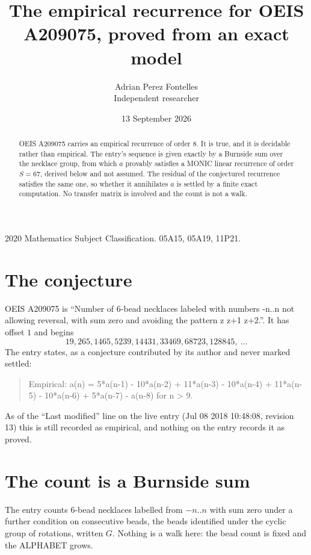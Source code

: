 \documentclass[11pt,a4paper]{article}
\title{The empirical recurrence for OEIS A209075, proved from an exact model}
\author{Adrian Perez Fontelles\\ \small Independent researcher}
\date{13 September 2026}
\theoremstyle{plain}
\theoremstyle{definition}
\begin{document}
\maketitle

\begin{abstract}
OEIS A209075 carries an empirical recurrence of order $8$. It is true, and it is
decidable rather than empirical. The entry's sequence is given exactly by a Burnside sum over the necklace group, from
which $a$ provably satisfies a MONIC linear recurrence of order $S=67$, derived below and not
assumed. The residual of the conjectured recurrence satisfies the same one, so whether it
annihilates $a$ is settled by a finite exact computation. No transfer matrix is involved and
the count is not a walk.
\end{abstract}

\noindent\small 2020 Mathematics Subject Classification. 05A15, 05A19, 11P21.\normalsize

\section{The conjecture}

OEIS A209075 is ``Number of 6-bead necklaces labeled with numbers -n..n not allowing reversal, with sum zero and avoiding the pattern z z+1 z+2.''. It has offset $1$ and begins
\[
19, 265, 1465, 5239, 14431, 33469, 68723, 128845,\ \dots
\]
The entry states, as a conjecture contributed by its author and never marked settled:
\begin{quote}
Empirical: a(n) = 5*a(n-1) - 10*a(n-2) + 11*a(n-3) - 10*a(n-4) + 11*a(n-5) - 10*a(n-6) + 5*a(n-7) - a(n-8) for n > 9.
\end{quote}
As of the ``Last modified'' line on the live entry (Jul 08 2018 10:48:08, revision 13)
this is still recorded as empirical, and nothing on the entry records it as proved.

\section{The count is a Burnside sum}

The entry counts $6$-bead necklaces labelled from $-n..n$ with sum zero under a further
condition on consecutive beads, the beads identified under the cyclic group of rotations, written $G$. Nothing is a
walk here: the bead count is fixed and the ALPHABET grows.
\end{document}
